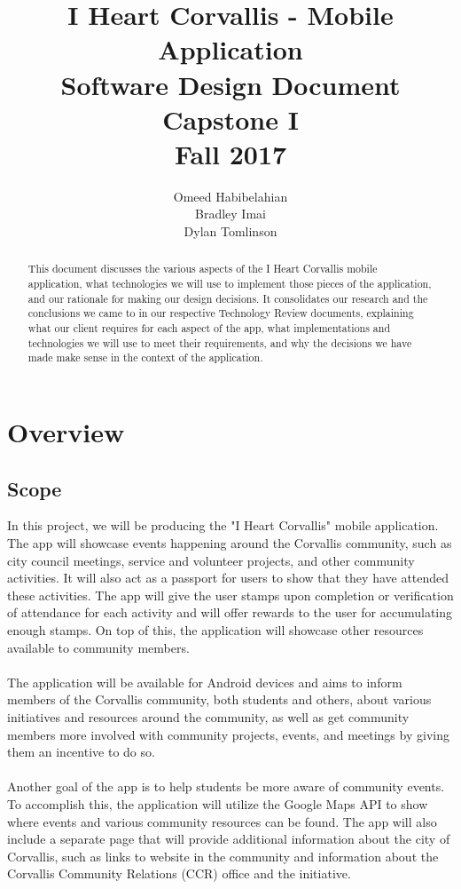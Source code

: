 \documentclass[draftclsnofoot, onecolumn, 10pt, compsoc]{IEEEtran}
\title{\textbf{I Heart Corvallis - Mobile Application\\Software Design Document}\\Capstone I\\Fall 2017}
\author{Omeed Habibelahian\\Bradley Imai\\Dylan Tomlinson}
\begin{document}
	\maketitle
	\begin{abstract}
		This document discusses the various aspects of the I Heart Corvallis mobile application, what technologies we will use to implement those pieces of the application, and our rationale for making our design decisions. It consolidates our research and the conclusions we came to in our respective Technology Review documents, explaining what our client requires for each aspect of the app, what implementations and technologies we will use to meet their requirements, and why the decisions we have made make sense in the context of the application.
	\end{abstract}
	\newpage
	
	\tableofcontents
	\newpage
	
	\section{Overview}
		\subsection{Scope}
			In this project, we will be producing the "I Heart Corvallis" mobile application. The app will showcase events happening around the Corvallis community, such as city council meetings, service and volunteer projects, and other community activities. It will also act as a passport for users to show that they have attended these activities. The app will give the user stamps upon completion or verification of attendance for each activity and will offer rewards to the user for accumulating enough stamps. On top of this, the application will showcase other resources available to community members. \\ \\
			The application will be available for Android devices and aims to inform members of the Corvallis community, both students and others, about various initiatives and resources around the community, as well as get community members more involved with community projects, events, and meetings by giving them an incentive to do so. \\ \\
			Another goal of the app is to help students be more aware of community events. To accomplish this, the application will utilize the Google Maps API to show where events and various community resources can be found. The app will also include a separate page that will provide additional information about the city of Corvallis, such as links to website in the community and information about the Corvallis Community Relations (CCR) office and the initiative.
\end{document}
